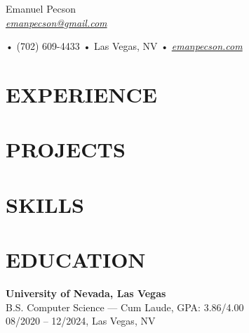 \documentclass[letterpaper,10pt]{article}
\newcommand{\customhref}[2]{%
  \href{#1}{{\robotoregular\fontsize{10}{12}\selectfont\color[HTML]{4B88E9}\textit{#2}}}%
}
\begin{document}

\begin{center}
  {\fontsize{20}{20}\robotoregular Emanuel Pecson} \\

  \customhref{mailto:emanpecson@gmail.com}{emanpecson@gmail.com}
	\hspace{0.75em}•\hspace{0.6em}
	(702) 609-4433
	\hspace{0.6em}•\hspace{0.6em}
	Las Vegas, NV
	\hspace{0.6em}•\hspace{0.6em}
	\customhref{https://emanpecson.com}{emanpecson.com}	
\end{center}

\vspace{0.5em}

\section*{EXPERIENCE}




\section*{PROJECTS}



\section*{SKILLS}


\section*{EDUCATION}
\textbf{University of Nevada, Las Vegas} \\
B.S. Computer Science — \textnormal{Cum Laude}, GPA: 3.86/4.00 \\
08/2020 – 12/2024, Las Vegas, NV
\end{document}
